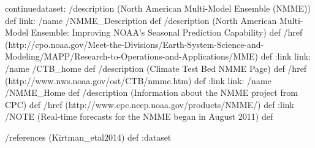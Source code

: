 \begin{ingrid}
continuedataset:
/description (North American Multi-Model Ensemble (NMME)) def
link:
/name /NMME_Description def
/description (North American Multi-Model Ensemble: Improving NOAA's Seasonal Prediction Capability) def
/href (http://cpo.noaa.gov/Meet-the-Divisions/Earth-System-Science-and-Modeling/MAPP/Research-to-Operations-and-Applications/MME) def
:link
link:
/name /CTB_home def
/description (Climate Test Bed NMME Page) def
/href (http://www.nws.noaa.gov/ost/CTB/nmme.htm) def
:link
link:
/name /NMME_Home def
/description (Information about the NMME project from CPC) def
/href (http://www.cpc.ncep.noaa.gov/products/NMME/) def
:link
/NOTE (Real-time forecasts for the NMME began in August 2011) def

/references (Kirtman_etal2014) def
:dataset
\end{ingrid}
